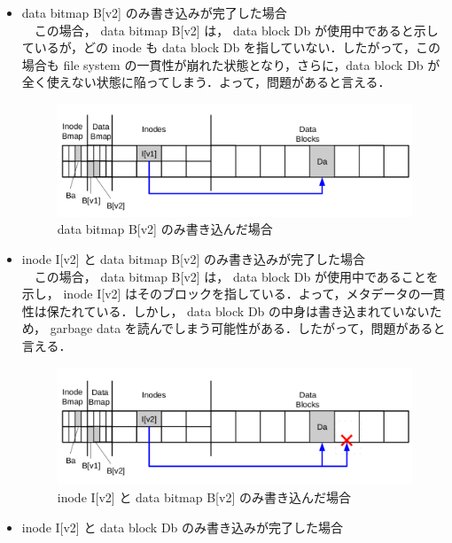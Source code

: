 \documentclass[graduation-thesis]{jsarticle}
\begin{document}
\begin{itemize}
	\item{data bitmap B[v2] のみ書き込みが完了した場合}\\
　この場合， data bitmap B[v2] は， data block Db が使用中であると示しているが，どの inode も data block Db を指していない．したがって，この場合も file system の一貫性が崩れた状態となり，さらに，data block Db が全く使えない状態に陥ってしまう．よって，問題があると言える．\\
\begin{figure}[H]
	\begin{center}
		\includegraphics[width=15.0cm,clip]{images/data5.pdf}
		\caption{data bitmap B[v2] のみ書き込んだ場合}
		\label{fig:data5}
	\end{center}
\end{figure}
	\item{inode I[v2] と data bitmap B[v2] のみ書き込みが完了した場合}\\
　この場合， data bitmap B[v2] は， data block Db が使用中であることを示し， inode I[v2] はそのブロックを指している．よって，メタデータの一貫性は保たれている．しかし， data block Db の中身は書き込まれていないため， garbage data を読んでしまう可能性がある．したがって，問題があると言える．\\
\begin{figure}[H]
	\begin{center}
		\includegraphics[width=15.0cm,clip]{images/data6.pdf}
		\caption{inode I[v2] と data bitmap B[v2] のみ書き込んだ場合}
		\label{fig:data6}
	\end{center}
\end{figure}
	\item{inode I[v2] と data block Db のみ書き込みが完了した場合}\\

\end{itemize}
\end{document}
